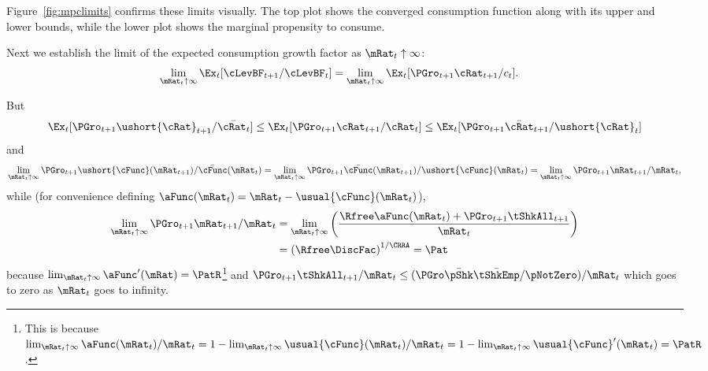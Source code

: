 \documentclass[BufferStockTheory]{subfiles}
\begin{document}
Figure~\ref{fig:mpclimits} confirms these limits visually.  The top
plot shows the converged consumption function along with its upper and lower bounds,
while the lower plot shows the marginal propensity to consume.

\renewcommand{\figFile}{mpclimits}
\hypertarget{\figFile}{}


\renewcommand{\figFile}{cFuncBounds}
\hypertarget{\figFile}{}


Next we establish the limit of the expected consumption growth factor
as $\mRat_{t} \uparrow \infty$:
\begin{align*}
  \lim_{\mRat_{t} \uparrow \infty} \Ex_{t}[
  \cLevBF_{t+1}/\cLevBF_{t}]  & = \lim_{\mRat_{t} \uparrow \infty} \Ex_{t}[
                                {\PGro}_{t+1} {\cRat}_{t+1}/c_{t}].
\end{align*}

But
\begin{align*}
  \Ex_{t}[{\PGro}_{t+1} {\ushort{\cRat}}_{t+1}/\bar{\cRat_{t}}] \leq \Ex_{t}[{\PGro}_{t+1} {\cRat}_{t+1}/\cRat_{t}] \leq \Ex_{t}[{\PGro}_{t+1} {\bar{\cRat}}_{t+1}/\ushort{\cRat}_{t}]
\end{align*}
and
\begin{equation*}  \label{eq:xttoinfty}
  \lim_{\mRat_t \uparrow \infty} \PGro_{t+1}\ushort{\cFunc}(\mRat_{t+1})/\bar{\cFunc}(\mRat_t) =
  \lim_{\mRat_{t} \uparrow \infty} \PGro_{t+1}\bar{\cFunc}(\mRat_{t+1})/\ushort{\cFunc}(\mRat_t) =
  \lim_{\mRat_{t} \uparrow \infty}\PGro_{t+1} \mRat_{t+1}/\mRat_t,
\end{equation*}
while (for convenience defining $\aFunc(\mRat_{t})=\mRat_{t}-\usual{\cFunc}(\mRat_{t})$), \hypertarget{xtp1toinfty}{}
\begin{align}  \label{eq:xtp1toinfty}
  \lim_{\mRat_{t} \uparrow \infty} \PGro_{t+1} \mRat_{t+1}/\mRat_t  & = \lim_{\mRat_{t} \uparrow \infty}
                                                                  \left(\frac{\Rfree \aFunc(\mRat_t)+{\PGro}_{t+1}\tShkAll_{t+1}}{\mRat_t}\right)
  \\  & = {(\Rfree \DiscFac)}^{1/\CRRA} = \Pat \notag
\end{align}
because $\lim_{\mRat_{t}\uparrow \infty} \aFunc^{\prime}(\mRat)=\PatR$\footnote{This is because $\lim_{\mRat_{t}\uparrow \infty} \aFunc(\mRat_{t})/\mRat_{t}=1-\lim_{\mRat_{t}\uparrow \infty} \usual{\cFunc}(\mRat_{t})/\mRat_{t}=1-\lim_{\mRat_{t}\uparrow \infty}\usual{\cFunc}^{\prime}(\mRat_{t})=\PatR$.} and
$\PGro_{t+1}\tShkAll_{t+1}/\mRat_{t} \leq (\PGro \bar{\pShk} \bar{\tShkEmp}/\pNotZero )/\mRat_{t}$ which
goes to zero as $\mRat_{t}$ goes to infinity.
\end{document}
